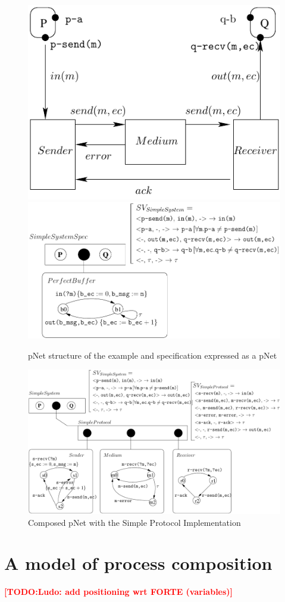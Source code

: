 \documentclass{lmcs}
\newcommand{\TODO}[1]{\textcolor{red}{\textbf{[TODO:#1]}}}
\begin{document}
\begin{figure}[t]
   \includegraphics[width=.37\textwidth]{XFIG/SimpleProt-Schema}
   \includegraphics[width=.62\textwidth]{XFIG/SimpleProt2-Spec}
   \caption{pNet structure of the example and specification expressed as a pNet}
   \label{SimpleProt:Spec}

\end{figure}

  
\begin{figure}[t]
  \centerline{\includegraphics[width=.9\textwidth]{XFIG/SimpleProt2-pNet-tau}}
  \caption{Composed pNet with the Simple Protocol Implementation}  \label{SimpleProt:Impl}
\end{figure}

\section{A model of process composition}\label{sec:OT}

\TODO{Ludo: add positioning wrt FORTE (variables)}
\end{document}
